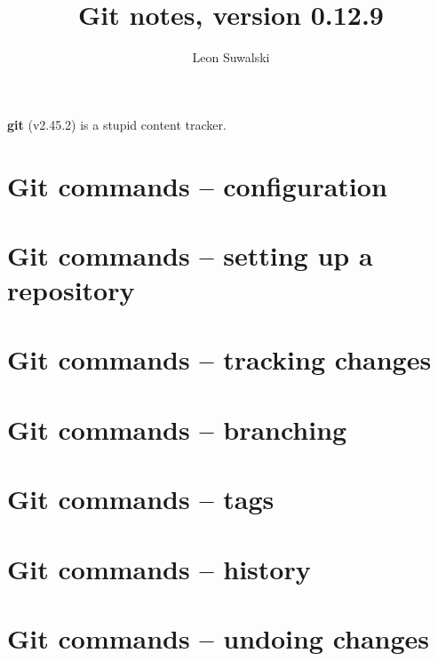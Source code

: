 \documentclass{charun}
\title{Git notes, version 0.12.9}
\author{Leon Suwalski}
\begin{document}
\maketitle
\raggedright

\textbf{git} (v2.45.2) is a stupid content tracker.

\section{Git commands -- configuration}


\section{Git commands -- setting up a repository}



\section{Git commands -- tracking changes}






\section{Git commands -- branching}







\section{Git commands -- tags}


\section{Git commands -- history}







\section{Git commands -- undoing changes}




\end{document}
